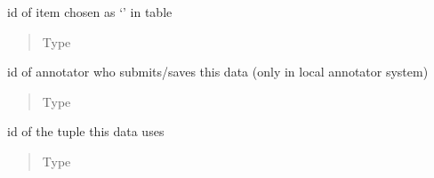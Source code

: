 \documentclass[a4paper,12pt,english]{sphinxmanual}
\begin{document}
\begin{fulllineitems}
\begin{fulllineitems}
\begin{quote}
\begin{description}
\end{description}\end{quote}

\end{fulllineitems}


\begin{fulllineitems}
\label{\detokenize{project_rst/models:project.models.Data.worst_id}}
id of item chosen as ‘’
in table {\hyperref[\detokenize{project_rst/models:project.models.Item}]{}}
\begin{quote}\begin{description}
\item[{Type}] \leavevmode
{}

\end{description}\end{quote}

\end{fulllineitems}


\begin{fulllineitems}
\label{\detokenize{project_rst/models:project.models.Data.anno_id}}
id of annotator who submits/saves
this data (only in local annotator system)
\begin{quote}\begin{description}
\item[{Type}] \leavevmode
{}

\end{description}\end{quote}

\end{fulllineitems}


\begin{fulllineitems}
\label{\detokenize{project_rst/models:project.models.Data.tuple_id}}
id of the tuple this data uses
\begin{quote}\begin{description}
\item[{Type}] \leavevmode
{}


\end{description}
\end{quote}
\end{fulllineitems}
\end{fulllineitems}
\end{document}
